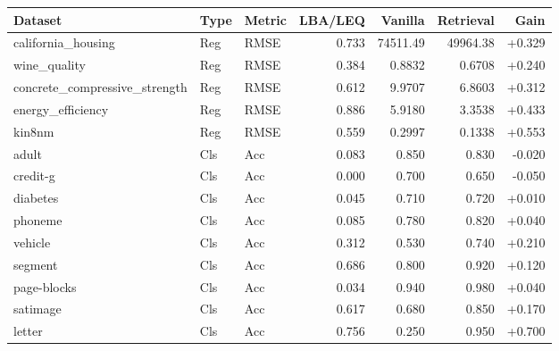 \begin{tabular}{lllrrrr}
\toprule
Dataset & Type & Metric & LBA/LEQ & Vanilla & Retrieval & Gain \\
\midrule
california\_housing & Reg & RMSE & 0.733 & 74511.49 & 49964.38 & +0.329 \\
wine\_quality & Reg & RMSE & 0.384 & 0.8832 & 0.6708 & +0.240 \\
concrete\_compressive\_strength & Reg & RMSE & 0.612 & 9.9707 & 6.8603 & +0.312 \\
energy\_efficiency & Reg & RMSE & 0.886 & 5.9180 & 3.3538 & +0.433 \\
kin8nm & Reg & RMSE & 0.559 & 0.2997 & 0.1338 & +0.553 \\
adult & Cls & Acc & 0.083 & 0.850 & 0.830 & -0.020 \\
credit-g & Cls & Acc & 0.000 & 0.700 & 0.650 & -0.050 \\
diabetes & Cls & Acc & 0.045 & 0.710 & 0.720 & +0.010 \\
phoneme & Cls & Acc & 0.085 & 0.780 & 0.820 & +0.040 \\
vehicle & Cls & Acc & 0.312 & 0.530 & 0.740 & +0.210 \\
segment & Cls & Acc & 0.686 & 0.800 & 0.920 & +0.120 \\
page-blocks & Cls & Acc & 0.034 & 0.940 & 0.980 & +0.040 \\
satimage & Cls & Acc & 0.617 & 0.680 & 0.850 & +0.170 \\
letter & Cls & Acc & 0.756 & 0.250 & 0.950 & +0.700 \\
\bottomrule
\end{tabular}
